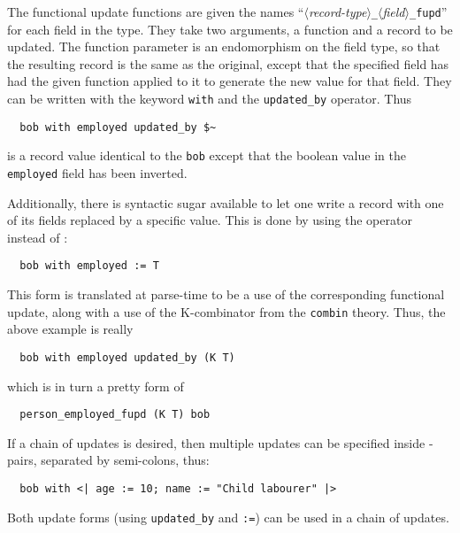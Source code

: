 The functional update functions are given the names
\mbox{``$\langle$\textsl{record-type}$\rangle$\texttt{\_}$\langle$\textsl{field}$\rangle$\texttt{\_fupd}''}
for each field in
the type.  They take two arguments, a function and a record to be
updated.  The function parameter is an endomorphism on the field type,
so that the resulting record is the same as the original, except that
the specified field has had the given function applied to it to
generate the new value for that field.  They can be written with the
keyword \texttt{with} and the \texttt{updated\_by} operator.  Thus
%
\begin{hol}
\begin{verbatim}
  bob with employed updated_by $~
\end{verbatim}
\end{hol}\noindent
%
is a record value identical to the \texttt{bob} except that the
boolean value in the \texttt{employed} field has been inverted.

Additionally, there is syntactic sugar available to let one write a
record with one of its fields replaced by a specific value.  This is
done by using the \holtxt{:=} operator instead of
:
%
\begin{hol}
\begin{verbatim}
  bob with employed := T
\end{verbatim}
\end{hol}
%
This form is translated at parse-time to be a use of the corresponding
functional update, along with a use of the \textsf{K}-combinator from
the \texttt{combin} theory.  Thus, the above example  is really
%
\begin{hol}
\begin{verbatim}
  bob with employed updated_by (K T)
\end{verbatim}
\end{hol}
%
which is in turn a pretty form of
%
\begin{hol}
\begin{verbatim}
  person_employed_fupd (K T) bob
\end{verbatim}
\end{hol}
%
If a chain of updates is desired, then multiple updates can be
specified inside \holtxt{<|}-\holtxt{|>} pairs, separated by
semi-colons, thus:
%
\begin{hol}
\begin{verbatim}
  bob with <| age := 10; name := "Child labourer" |>
\end{verbatim}
\end{hol}
%
Both update forms (using \texttt{updated\_by} and \texttt{:=}) can be
used in a chain of updates.

